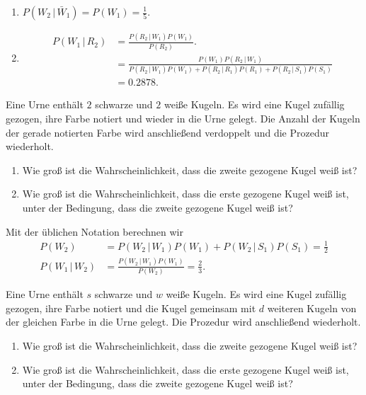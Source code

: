 \solution
\begin{enumerate}
    \item $P(W_2 \,|\, \bar W_1) = P(W_1) = \frac{1}{5}$.
    \item \begin{align*}
            P(W_1 \,|\, R_2) &= \frac{  P( R_2 \,|\, W_1 ) P( W_1 ) }{ P(R_2) }. \\
            &= \frac{ P(W_1) P( R_2 \,|\, W_1)  }{ P(R_2\,|\, W_1) P(W_1) + P( R_2 \,|\, R_1 ) P(R_1) + P(R_2 \,|\, S_1) P(S_1)  } \\
            &= 0.2878.
        \end{align*}
\end{enumerate}


 Eine Urne
enthält $2$ schwarze und $2$ weiße Kugeln. Es wird eine Kugel zufällig gezogen,
ihre Farbe notiert und wieder in die Urne gelegt. Die Anzahl der Kugeln der gerade notierten
Farbe wird anschließend verdoppelt und die Prozedur wiederholt. 
\begin{enumerate}
    \item Wie groß ist die Wahrscheinlichkeit, dass die zweite gezogene Kugel weiß ist?
    \item Wie groß ist die Wahrscheinlichkeit, dass die erste gezogene Kugel
        weiß ist, unter der Bedingung, dass die zweite gezogene Kugel weiß ist?
\end{enumerate}

\solution
Mit der üblichen Notation berechnen wir
\begin{align*}
    P(W_2) &= P( W_2 \,|\, W_1 ) P(W_1) + P(W_2 \,|\, S_1) P(S_1) = \frac{1}{2}\\
    P(W_1 \,|\, W_2 ) &= \frac{ P(W_2 \,|\, W_1 ) P( W_1 )  }{ P(W_2) } = \frac{2}{3}. 
\end{align*}

 Eine Urne
enthält $s$ schwarze und $w$ weiße Kugeln. Es wird eine Kugel zufällig gezogen,
ihre Farbe notiert und die Kugel gemeinsam mit $d$ weiteren Kugeln von der
gleichen Farbe in die Urne gelegt. Die Prozedur wird anschließend wiederholt. 
\begin{enumerate}
    \item Wie groß ist die Wahrscheinlichkeit, dass die zweite gezogene Kugel weiß ist?
    \item Wie groß ist die Wahrscheinlichkeit, dass die erste gezogene Kugel
        weiß ist, unter der Bedingung, dass die zweite gezogene Kugel weiß ist?
\end{enumerate}

